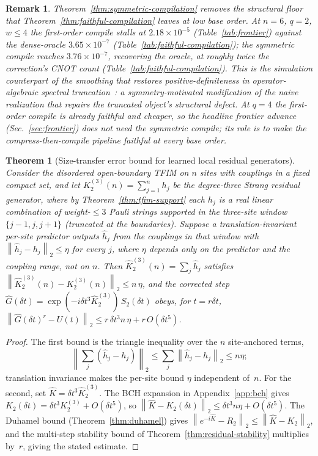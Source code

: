 \documentclass[aps,prresearch,reprint,superscriptaddress,nofootinbib,amsmath,amssymb]{revtex4-2}
\newcommand{\tfim}{TFIM}
\newcommand{\norm}[1]{\left\lVert #1 \right\rVert}
\newcommand{\dt}{\delta t}
\newtheorem{theorem}{Theorem}
\newtheorem{remark}{Remark}
\begin{document}
\begin{remark}
Theorem~\ref{thm:symmetric-compilation} removes the structural floor that Theorem~\ref{thm:faithful-compilation} leaves at low base order. At $n=6$, $q=2$, $w\le4$ the first-order compile stalls at $2.18\times10^{-5}$ (Table~\ref{tab:frontier}) against the dense-oracle $3.65\times10^{-7}$ (Table~\ref{tab:faithful-compilation}); the symmetric compile reaches $3.76\times10^{-7}$, recovering the oracle, at roughly twice the correction's CNOT count (Table~\ref{tab:faithful-compilation}). This is the simulation counterpart of the smoothing that restores positive-definiteness in operator-algebraic spectral truncation~\cite{hashimoto2024spectral}: a symmetry-motivated modification of the naive realization that repairs the truncated object's structural defect. At $q=4$ the first-order compile is already faithful and cheaper, so the headline frontier advance (Sec.~\ref{sec:frontier}) does not need the symmetric compile; its role is to make the compress-then-compile pipeline faithful at \emph{every} base order.
\end{remark}

\begin{theorem}[Size-transfer error bound for learned local residual generators]
\label{thm:size-transfer}
Consider the disordered open-boundary \tfim{} on $n$ sites with couplings in a fixed compact set, and let $K_2^{(3)}(n)=\sum_{j=1}^{n} h_j$ be the degree-three Strang residual generator, where by Theorem~\ref{thm:tfim-support} each $h_j$ is a real linear combination of weight-$\le 3$ Pauli strings supported in the three-site window $\{j-1,j,j+1\}$ (truncated at the boundaries). Suppose a translation-invariant per-site predictor outputs $\widehat h_j$ from the couplings in that window with $\norm{\widehat h_j-h_j}_2\le\eta$ for every $j$, where $\eta$ depends only on the predictor and the coupling range, not on $n$. Then $\widehat K_2^{(3)}(n)=\sum_j\widehat h_j$ satisfies $\norm{\widehat K_2^{(3)}(n)-K_2^{(3)}(n)}_2\le n\,\eta$, and the corrected step $\widehat G(\dt)=\exp(-i\dt^3\widehat K_2^{(3)})\,S_2(\dt)$ obeys, for $t=r\dt$, $\norm{\widehat G(\dt)^r-U(t)}_2\le r\,\dt^3 n\,\eta + r\,O(\dt^5)$.
\end{theorem}
\begin{proof}
The first bound is the triangle inequality over the $n$ site-anchored terms,
\begin{equation*}
    \norm{\textstyle\sum_j(\widehat h_j-h_j)}_2\le\sum_j\norm{\widehat h_j-h_j}_2\le n\eta;
\end{equation*}
translation invariance makes the per-site bound $\eta$ independent of~$n$. For the second, set $\widehat K=\dt^3\widehat K_2^{(3)}$. The BCH expansion in Appendix~\ref{app:bch} gives $K_2(\dt)=\dt^3K_2^{(3)}+O(\dt^5)$, so $\norm{\widehat K-K_2(\dt)}_2\le\dt^3 n\eta+O(\dt^5)$. The Duhamel bound (Theorem~\ref{thm:duhamel}) gives $\norm{e^{-i\widehat K}-R_2}_2\le\norm{\widehat K-K_2}_2$, and the multi-step stability bound of Theorem~\ref{thm:residual-stability} multiplies by~$r$, giving the stated estimate.
\end{proof}
\end{document}
